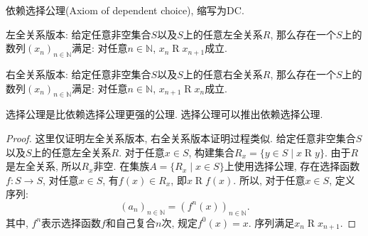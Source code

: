 \begin{axiom}[依赖选择公理]
	依赖选择公理(Axiom of dependent choice), 缩写为DC.

	左全关系版本: 给定任意非空集合$S$以及$S$上的任意左全关系$R$, 那么存在一个$S$上的数列$(x_n)_{n\in\mathbb N}$满足: 对任意$n\in \mathbb N$, $x_n\mathrel Rx_{n+1}$成立.

	右全关系版本: 给定任意非空集合$S$以及$S$上的任意右全关系$R$, 那么存在一个$S$上的数列$(x_n)_{n\in\mathbb N}$满足: 对任意$n\in \mathbb N$, $x_{n+1}\mathrel Rx_n$成立.
\end{axiom}

选择公理是比依赖选择公理更强的公理. 选择公理可以推出依赖选择公理.

\begin{proof}
	这里仅证明左全关系版本, 右全关系版本证明过程类似. 给定任意非空集合$S$以及$S$上的任意左全关系$R$. 对于任意$x\in S$, 构建集合$R_x=\{y\in S\mid x\mathrel Ry\}$. 由于$R$是左全关系, 所以$R_x$非空. 在集族$A=\{R_x\mid x\in S\}$上使用选择公理, 存在选择函数$f\colon S\rightarrow S$, 对任意$x\in S$, 有$f(x)\in R_x$, 即$x\mathrel Rf(x)$. 所以, 对于任意$x\in S$, 定义序列:
	\[
	(a_n)_{n\in \mathbb N}=(f^n(x))_{n\in \mathbb N}.
	\]
	其中, $f^n$表示选择函数$f$和自己复合$n$次, 规定$f^0(x)=x$. 序列满足$x_n\mathrel Rx_{n+1}$.
\end{proof}
